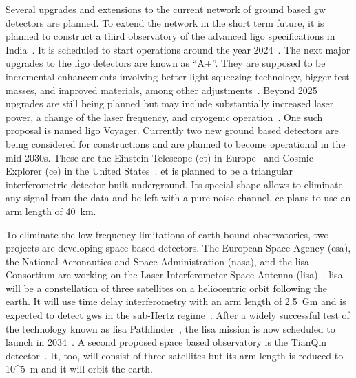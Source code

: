 Several upgrades and extensions to the current network of ground based \acrshort{gw} detectors are planned. To extend the network in the short term future, it is planned to construct a third observatory of the advanced \acrshort{ligo} specifications in India~\cite{Iyer:2011aaa, Saleem:2021iwi}. It is scheduled to start operations around the year 2024~\cite{KAGRA:2013rdx}. The next major upgrades to the \acrshort{ligo} detectors are known as ``A+''. They are supposed to be incremental enhancements involving better light squeezing technology, bigger test masses, and improved materials, among other adjustments~\cite{LIGOScientific:2017aaa}. Beyond 2025 upgrades are still being planned but may include substantially increased laser power, a change of the laser frequency, and cryogenic operation~\cite{LIGOScientific:2017aaa}. One such proposal is named \acrshort{ligo} Voyager. Currently two new ground based detectors are being considered for constructions and are planned to become operational in the mid 2030s. These are the Einstein Telescope (\acrshort{et}) in Europe~\cite{Maggiore:2019uih} and Cosmic Explorer (\acrshort{ce}) in the United States~\cite{Reitze:2019iox}. \acrshort{et} is planned to be a triangular interferometric detector built underground. Its special shape allows to eliminate any signal from the data and be left with a pure noise channel. \acrshort{ce} plans to use an arm length of \SI{40}{\kilo\metre}.

To eliminate the low frequency limitations of earth bound observatories, two projects are developing space based detectors. The European Space Agency (\acrshort{esa}), the National Aeronautics and Space Administration (\acrshort{nasa}), and the \acrshort{lisa} Consortium are working on the Laser Interferometer Space Antenna (\acrshort{lisa})~\cite{LISA:2017pwj, ESA:2022aaa, NASA:2022aaa}. \acrshort{lisa} will be a constellation of three satellites on a heliocentric orbit following the earth. It will use time delay interferometry with an arm length of \SI{2.5}{\giga\metre} and is expected to detect \acrshort{gw}s in the sub-Hertz regime~\cite{LISA:2017pwj}. After a widely successful test of the technology known as \acrshort{lisa} Pathfinder~\cite{McNamara:2008zz, Armano:2016bkm, Armano:2018kix}, the \acrshort{lisa} mission is now scheduled to launch in 2034~\cite{ESA:2022aaa}. A second proposed space based observatory is the TianQin detector~\cite{TianQin:2015yph}. It, too, will consist of three satellites but its arm length is reduced to \SI[parse-numbers=false]{10^5}{\metre} and it will orbit the earth.

